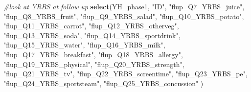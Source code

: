 \documentclass[]{article}
\newenvironment{Shaded}{\begin{snugshade}}{\end{snugshade}}
\newcommand{\KeywordTok}[1]{\textcolor[rgb]{0.13,0.29,0.53}{\textbf{#1}}}
\newcommand{\StringTok}[1]{\textcolor[rgb]{0.31,0.60,0.02}{#1}}
\newcommand{\CommentTok}[1]{\textcolor[rgb]{0.56,0.35,0.01}{\textit{#1}}}
\newcommand{\NormalTok}[1]{#1}
\begin{document}
\begin{Shaded}
\begin{Highlighting}[]
\CommentTok{#look at YRBS at follow up}
\KeywordTok{select}\NormalTok{(YH_phase1, }\StringTok{"ID"}\NormalTok{,}
 \StringTok{"flup_Q7_YRBS_juice"}\NormalTok{, }\StringTok{"flup_Q8_YRBS_fruit"}\NormalTok{, }\StringTok{"flup_Q9_YRBS_salad"}\NormalTok{,}
 \StringTok{"flup_Q10_YRBS_potato"}\NormalTok{, }\StringTok{"flup_Q11_YRBS_carrot"}\NormalTok{, }\StringTok{"flup_Q12_YRBS_otherveg"}\NormalTok{, }
 \StringTok{"flup_Q13_YRBS_soda"}\NormalTok{, }\StringTok{"flup_Q14_YRBS_sportdrink"}\NormalTok{, }\StringTok{"flup_Q15_YRBS_water"}\NormalTok{, }
 \StringTok{"flup_Q16_YRBS_milk"}\NormalTok{, }\StringTok{"flup_Q17_YRBS_breakfast"}\NormalTok{, }\StringTok{"flup_Q18_YRBS_allergy"}\NormalTok{,}
 \StringTok{"flup_Q19_YRBS_physical"}\NormalTok{, }\StringTok{"flup_Q20_YRBS_strength"}\NormalTok{, }\StringTok{"flup_Q21_YRBS_tv"}\NormalTok{,}
 \StringTok{"flup_Q22_YRBS_screentime"}\NormalTok{, }\StringTok{"flup_Q23_YRBS_pe"}\NormalTok{, }\StringTok{"flup_Q24_YRBS_sportsteam"}\NormalTok{, }
 \StringTok{"flup_Q25_YRBS_concussion"}
\NormalTok{)}
\end{Highlighting}
\end{Shaded}
\end{document}

